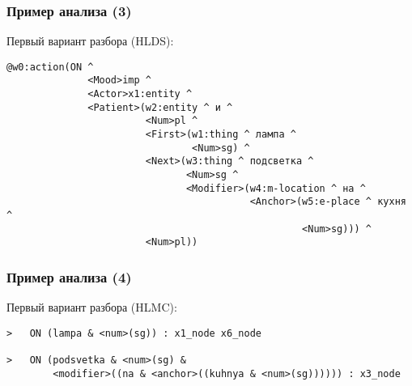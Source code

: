\documentclass{beamer}
\begin{document}
\begin{frame}[fragile]
\frametitle{Пример анализа (3)}
Первый вариант разбора (HLDS):\\
\bigskip
\begin{center}
{\scriptsize \begin{verbatim}
@w0:action(ON ^ 
              <Mood>imp ^ 
              <Actor>x1:entity ^ 
              <Patient>(w2:entity ^ и ^ 
                        <Num>pl ^ 
                        <First>(w1:thing ^ лампа ^ 
                                <Num>sg) ^ 
                        <Next>(w3:thing ^ подсветка ^ 
                               <Num>sg ^ 
                               <Modifier>(w4:m-location ^ на ^ 
                                          <Anchor>(w5:e-place ^ кухня ^ 
                                                   <Num>sg))) ^ 
                        <Num>pl))
\end{verbatim}
}                        
\end{center}
\end{frame}

\begin{frame}[fragile]
\frametitle{Пример анализа (4)}
Первый вариант разбора (HLMC):\\
\bigskip
\begin{center}
{\scriptsize \begin{verbatim}
>   ON (lampa & <num>(sg)) : x1_node x6_node 

>   ON (podsvetka & <num>(sg) & 
        <modifier>((na & <anchor>((kuhnya & <num>(sg)))))) : x3_node 
\end{verbatim}
}                        
\end{center}
\end{frame}
\end{document}

